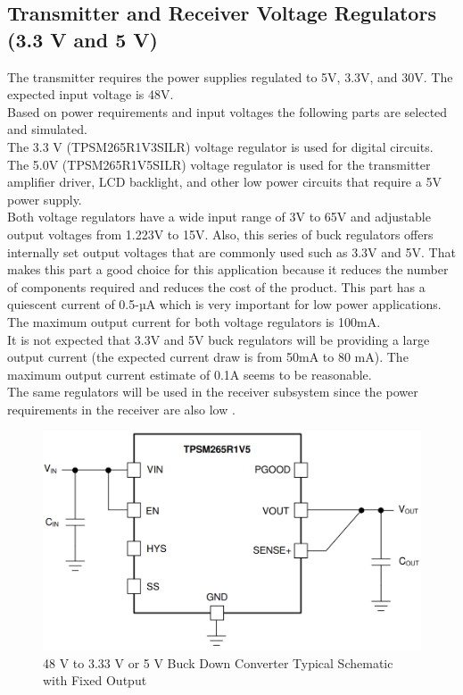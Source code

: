 \documentclass[12pt]{article}
\begin{document}
\subsection{Transmitter and Receiver Voltage Regulators (3.3 V and 5 V)}

\indent \indent
The transmitter requires the power supplies regulated to 5V, 3.3V, and 30V. The expected input voltage is 48V. \\
Based on power requirements and input voltages the following parts are selected and simulated.  \\

\indent
The 3.3 V (TPSM265R1V3SILR) voltage regulator is used for digital circuits. \\

\indent
The 5.0V (TPSM265R1V5SILR) voltage regulator is used for the transmitter amplifier driver, LCD backlight, and other low power circuits that require a 5V power supply. \\

\indent
Both voltage regulators have a wide input range of 3V to 65V and adjustable output voltages from 1.223V to 15V. Also, this series of buck regulators offers internally set output voltages that are commonly used such as 3.3V and 5V. That makes this part a good choice for this application because it reduces the number of components required and reduces the cost of the product. This part has a quiescent current of 0.5-µA which is very important for low power applications. \\

\indent
The maximum output current for both voltage regulators is 100mA. \\

\indent
It is not expected that 3.3V and 5V buck regulators will be providing a large output current (the expected current draw is from 50mA to 80 mA). The maximum output current estimate of 0.1A seems to be reasonable. \\

\indent
The same regulators will be used in the receiver subsystem since the power requirements in the receiver are also low \cite{TPSM265R1}.\\

\begin{figure}[h!]
\centering
\includegraphics[width=0.75\linewidth]{TPSM265R1V5_ex}
\caption{48 V to 3.33 V or 5 V Buck Down Converter Typical Schematic with Fixed Output \cite{TPSM265R1}}
\end{figure}
\end{document}
